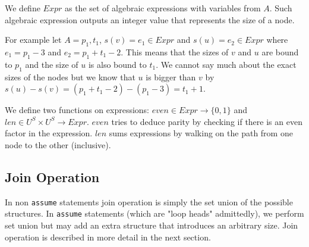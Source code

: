 We define $Expr$ as the set of algebraic expressions with variables from $A$. Such algebraic expression outputs an integer value that represents the size of a node.

For example let $A={p_1,t_1}$, $s(v)=e_1\in Expr$ and $s(u)=e_2\in Expr$ where $e_1=p_1-3$ and $e_2=p_1+t_1-2$. This means that the sizes of $v$ and $u$ are bound to $p_1$ and the size of $u$ is also bound to $t_1$. We cannot say much about the exact sizes of the nodes but we know that $u$ is bigger than $v$ by $s(u)-s(v)=(p_1+t_1-2)-(p_1-3)=t_1+1$.

We define two functions on expressions: $even\in Expr\to\{0,1\}$ and $len\in U^S\times U^S\to Expr$. $even$ tries to deduce parity by checking if there is an even factor in the expression. $len$ sums expressions by walking on the path from one node to the other (inclusive).

\subsection*{Join Operation}
In non \texttt{assume} statements join operation is simply the set union of the possible structures. In \texttt{assume} statements (which are "loop heads" admittedly), we perform set union but may add an extra structure that introduces an arbitrary size. Join operation is described in more detail in the next section. 

